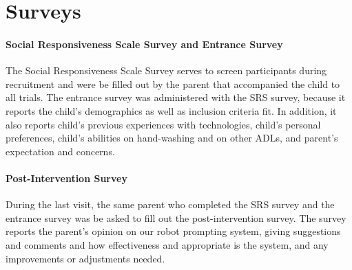 \section{Surveys}

\paragraph{Social Responsiveness Scale Survey and Entrance Survey}
The Social Responsiveness Scale Survey serves to screen participants during recruitment and were be filled out by the parent that accompanied the child to all trials.  The entrance survey was administered with the SRS survey, because it reports the child's demographics as well as inclusion criteria fit.  In addition, it also reports child's previous experiences with technologies, child's personal preferences, child's abilities on hand-washing and on other ADLs, and parent's expectation and concerns.

\paragraph{Post-Intervention Survey}
During the last visit, the same parent who completed the SRS survey and the entrance survey was be asked to fill out the post-intervention survey.  The survey reports the parent's opinion on our robot prompting system, giving suggestions and comments and how effectiveness and appropriate is the system, and any improvements or adjustments needed.
